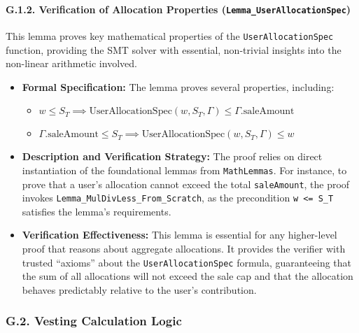 \documentclass[
  english,
  onecolumn]{article}
\providecommand{\tightlist}{%
  \setlength{\itemsep}{0pt}\setlength{\parskip}{0pt}}
\begin{document}
\paragraph{\texorpdfstring{G.1.2. Verification of Allocation Properties
(\texttt{Lemma\_UserAllocationSpec})}{G.1.2. Verification of Allocation Properties (Lemma\_UserAllocationSpec)}}\label{g.1.2.-verification-of-allocation-properties-lemma_userallocationspec}

This lemma proves key mathematical properties of the
\texttt{UserAllocationSpec} function, providing the SMT solver with
essential, non-trivial insights into the non-linear arithmetic involved.

\begin{itemize}
\tightlist
\item
  \textbf{Formal Specification:} The lemma proves several properties,
  including:

  \begin{itemize}
  \tightlist
  \item
    \(w \le S_T \implies \text{UserAllocationSpec}(w, S_T, \Gamma) \le \Gamma.\text{saleAmount}\)
  \item
    \(\Gamma.\text{saleAmount} \le S_T \implies \text{UserAllocationSpec}(w, S_T, \Gamma) \le w\)
  \end{itemize}
\item
  \textbf{Description and Verification Strategy:} The proof relies on
  direct instantiation of the foundational lemmas from
  \texttt{MathLemmas}. For instance, to prove that a user's allocation
  cannot exceed the total \texttt{saleAmount}, the proof invokes
  \texttt{Lemma\_MulDivLess\_From\_Scratch}, as the precondition
  \texttt{w\ \textless{}=\ S\_T} satisfies the lemma's requirements.
\item
  \textbf{Verification Effectiveness:} This lemma is essential for any
  higher-level proof that reasons about aggregate allocations. It
  provides the verifier with trusted ``axioms'' about the
  \texttt{UserAllocationSpec} formula, guaranteeing that the sum of all
  allocations will not exceed the sale cap and that the allocation
  behaves predictably relative to the user's contribution.
\end{itemize}

\subsubsection{G.2. Vesting Calculation
Logic}\label{g.2.-vesting-calculation-logic}
\end{document}
